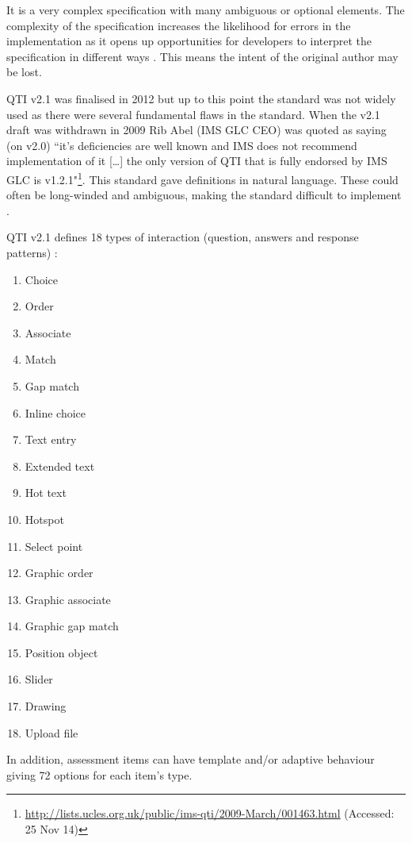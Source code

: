 It is a very complex specification with many ambiguous or optional elements. The complexity of the specification increases the likelihood for errors in the implementation as it opens up opportunities for developers to interpret the specification in different ways \citep{failQTI}. This means the intent of the original author may be lost.

\gls{QTI} v2.1 was finalised in 2012 \citep{qtiOverview} but up to this point the standard was not widely used \citep{eps265979} as there were several fundamental flaws in the standard. When the v2.1 draft was withdrawn in 2009 Rib Abel (IMS GLC CEO) was quoted as saying (on v2.0) ``it’s deficiencies are well known and IMS does not recommend implementation of it [\dots] the only version of QTI that is fully endorsed by IMS GLC is v1.2.1"\footnote{\url{http://lists.ucles.org.uk/public/ims-qti/2009-March/001463.html} (Accessed: 25 Nov 14)}. This standard gave definitions in natural language. These could often be long-winded and ambiguous, making the standard difficult to implement \citep{failQTI, Sclater2007}.

\gls{QTI} v2.1 defines 18 types of interaction (question, answers and response patterns) \citep{qtiImplementation}:
\begin{multicols}{3}
\begin{enumerate}
\item Choice
\item Order
\item Associate
\item Match
\item Gap match
\item Inline choice
\item Text entry
\item Extended text
\item Hot text
\item Hotspot
\item Select point
\item Graphic order
\item Graphic associate
\item Graphic gap match
\item Position object
\item Slider
\item Drawing
\item Upload file
\end{enumerate}
\end{multicols}

In addition, assessment items can have template and/or adaptive behaviour giving 72 options for each item's type. 

